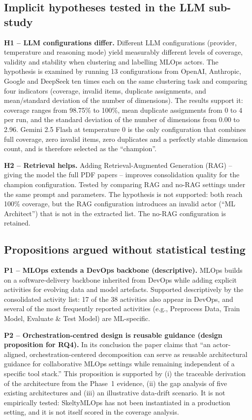 \documentclass[11pt,a4paper]{article}
\begin{document}
\subsection{Implicit hypotheses tested in the LLM sub-study}

\textbf{H1 -- LLM configurations differ.}
Different LLM configurations (provider, temperature and reasoning mode) yield measurably different levels of coverage, validity and stability when clustering and labelling MLOps actors. The hypothesis is examined by running 13 configurations from OpenAI, Anthropic, Google and DeepSeek ten times each on the same clustering task and comparing four indicators (coverage, invalid items, duplicate assignments, and mean/standard deviation of the number of dimensions). The results support it: coverage ranges from 98.75\% to 100\%, mean duplicate assignments from 0 to 4 per run, and the standard deviation of the number of dimensions from 0.00 to 2.96. Gemini 2.5 Flash at temperature 0 is the only configuration that combines full coverage, zero invalid items, zero duplicates and a perfectly stable dimension count, and is therefore selected as the ``champion''.

\textbf{H2 -- Retrieval helps.}
Adding Retrieval-Augmented Generation (RAG) -- giving the model the full PDF papers -- improves consolidation quality for the champion configuration. Tested by comparing RAG and no-RAG settings under the same prompt and parameters. The hypothesis is not supported: both reach 100\% coverage, but the RAG configuration introduces an invalid actor (``ML Architect'') that is not in the extracted list. The no-RAG configuration is retained.

\subsection{Propositions argued without statistical testing}

\textbf{P1 -- MLOps extends a DevOps backbone (descriptive).}
MLOps builds on a software-delivery backbone inherited from DevOps while adding explicit activities for evolving data and model artefacts. Supported descriptively by the consolidated activity list: 17 of the 38 activities also appear in DevOps, and several of the most frequently reported activities (e.g., Preprocess Data, Train Model, Evaluate \& Test Model) are ML-specific.

\textbf{P2 -- Orchestration-centred design is reusable guidance (design proposition for RQ4).}
In its conclusion the paper claims that ``an actor-aligned, orchestration-centered decomposition can serve as reusable architectural guidance for collaborative MLOps settings while remaining independent of a specific tool stack.'' This proposition is supported by (i) the traceable derivation of the architecture from the Phase~1 evidence, (ii) the gap analysis of five existing architectures and (iii) an illustrative data-drift scenario. It is not empirically tested: SkeltyMLOps has not been instantiated in a production setting, and it is not itself scored in the coverage analysis.
\end{document}
